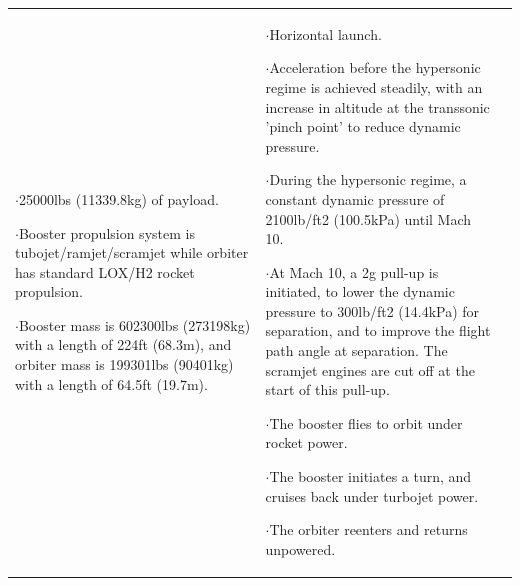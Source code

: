 {\begin{landscape}
\begin{xltabular}{\linewidth}{|X|X|X|}
	$\cdot$25000lbs (11339.8kg) of payload.
	
	$\cdot$Booster propulsion system is tubojet/ramjet/scramjet while orbiter has standard LOX/H2 rocket propulsion. 
	
	$\cdot$Booster mass is 602300lbs (273198kg) with a length of 224ft (68.3m), and orbiter mass is 199301lbs (90401kg) with a length of 64.5ft (19.7m).
	
	&\small
	
	$\cdot$Horizontal launch.
	
	$\cdot$Acceleration before the hypersonic regime is achieved steadily, with an increase in altitude at the transsonic 'pinch point' to reduce dynamic pressure. 
	
	$\cdot$During the hypersonic regime, a constant dynamic pressure of 2100lb/ft2 (100.5kPa) until Mach 10.
	
	$\cdot$At Mach 10, a 2g pull-up is initiated, to lower the dynamic pressure to 300lb/ft2 (14.4kPa) for separation, and to improve the flight path angle at separation. The scramjet engines are cut off at the start of this pull-up.  
	
	$\cdot$The booster flies to orbit under rocket power. 
	
	$\cdot$The booster initiates a turn, and cruises back under turbojet power. 
	
	$\cdot$The orbiter reenters and returns unpowered. 
	

\end{xltabular}
\end{landscape}}

